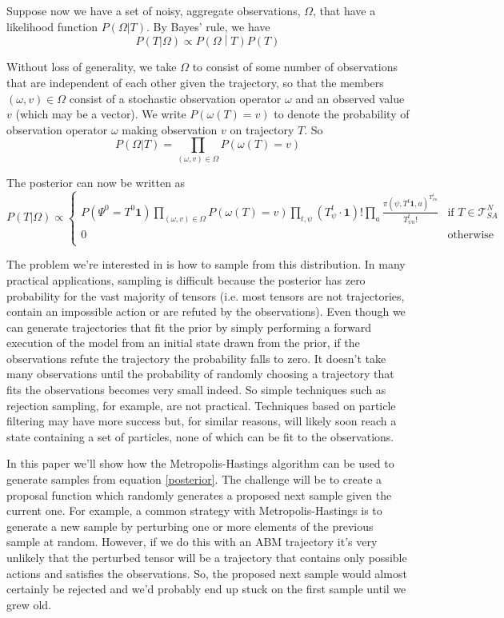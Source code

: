 \documentclass{article}
\begin{document}
Suppose now we have a set of noisy, aggregate observations, $\Omega$, that have a likelihood function $P(\Omega|T)$. By Bayes' rule, we have
\[
P(T|\Omega) \propto P\left(\Omega \middle| T\right)P(T)
\]

Without loss of generality, we take $\Omega$ to consist of some number of observations that are independent of each other given the trajectory, so that the members $(\omega,v)\in \Omega$ consist of a stochastic observation operator $\omega$ and an observed value $v$ (which may be a vector). We write $P(\omega(T)=v)$ to denote the probability of observation operator $\omega$ making observation $v$ on trajectory $T$. So
\[
P(\Omega|T) = \prod_{(\omega,v) \in \Omega} P(\omega(T)=v)
\]

The posterior can now be written as
\begin{equation}
P(T|\Omega) \propto 
\begin{cases}
P(\Psi^0 = T^0\mathbf{1})
\prod_{(\omega,v) \in \Omega} P\left(\omega(T)=v\right)
\prod_{t, \psi}\left(T^t_{\psi}\cdot\mathbf{1}\right)!
\prod_{a}\frac{\pi(\psi,T^t\mathbf{1},a)^{T^{t}_{\psi a}}}{T^t_{\psi a}!} & \text{if } T \in \mathcal{T}^N_{SA} \\
0 & \text{otherwise}\\
\end{cases}
\label{posterior}
\end{equation}

The problem we're interested in is how to sample from this distribution. In many practical applications, sampling is difficult because the posterior has zero probability for the vast majority of tensors (i.e. most tensors are not trajectories, contain an impossible action or are refuted by the observations). Even though we can generate trajectories that fit the prior by simply performing a forward execution of the model from an initial state drawn from the prior, if the observations refute the trajectory the probability falls to zero. It doesn't take many observations until the probability of randomly choosing a trajectory that fits the observations becomes very small indeed. So simple techniques such as rejection sampling, for example, are not practical. Techniques based on particle filtering may have more success but, for similar reasons, will likely soon reach a state containing a set of particles, none of which can be fit to the observations.

In this paper we'll show how the Metropolis-Hastings algorithm can be used to generate samples from equation \ref{posterior}. The challenge will be to create a proposal function which randomly generates a proposed next sample given the current one. For example, a common strategy with Metropolis-Hastings is to generate a new sample by perturbing one or more elements of the previous sample at random. However, if we do this with an ABM trajectory it's very unlikely that the perturbed tensor will be a trajectory that contains only possible actions and satisfies the observations. So, the proposed next sample would almost certainly be rejected and we'd probably end up stuck on the first sample until we grew old.
\end{document}
